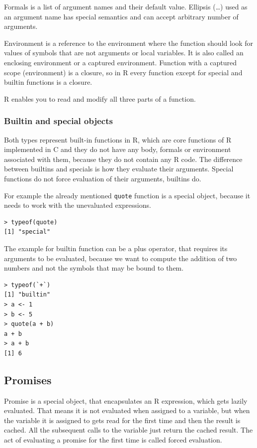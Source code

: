 \documentclass[thesis=B,english]{FITthesis}[2012/10/20]
\begin{document}
Formals is a list of argument names and their default value. Ellipsis (\ldots) used as an argument name has special semantics and can accept arbitrary number of arguments. 

Environment is a reference to the environment where the function should look for values of symbols that are not arguments or local variables. It is also called an enclosing environment or a captured environment. Function with a captured scope (environment) is a closure, so in R every function except for special and builtin functions is a closure.

R enables you to read and modify all three parts of a function.

\subsubsection{Builtin and special objects}
Both types represent built-in functions in R, which are core functions of R implemented in C and they do not have any body, formals or environment associated with them, because they do not contain any R code. The difference between builtins and specials is how they evaluate their arguments. Special functions do not force evaluation of their arguments, builtins do.

For example the already mentioned \verb|quote| function is a special object, because it needs to work with the unevaluated expressions. 

\begin{verbatim}
> typeof(quote)
[1] "special" 
\end{verbatim}

The example for builtin function can be a plus operator, that requires its arguments to be evaluated, because we want to compute the addition of two numbers and not the symbols that may be bound to them.

\begin{verbatim}
> typeof(`+`)
[1] "builtin" 
> a <- 1
> b <- 5
> quote(a + b)
a + b
> a + b
[1] 6 
\end{verbatim}

\subsection{Promises}
Promise is a special object, that encapsulates an R expression, which gets lazily evaluated. That means it is not evaluated when assigned to a variable, but when the variable it is assigned to gets read for the first time and then the result is cached. All the subsequent calls to the variable just return the cached result. The act of evaluating a promise for the first time is called forced evaluation. 
\end{document}
